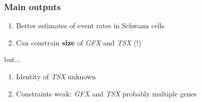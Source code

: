 \documentclass{beamer}
\begin{document}
\begin{frame}
\begin{columns}
\begin{column}{0.5\textwidth}
        \end{column}
    \end{columns}
\end{frame}

%

\begin{frame}
    \frametitle{Main outputs}
    \begin{enumerate}
        \item Better estimates of event rates in Schwann cells
        \item Can constrain \textbf{size} of \emph{GFX} and \emph{TSX} (!)
    \end{enumerate}
    \begin{center}
        but...
    \end{center}
    \begin{enumerate}
        \item Identity of \emph{TSX} unknown
        \item Constraints weak: \emph{GFX} and \emph{TSX} probably multiple genes
    \end{enumerate}

\end{frame}

\end{document}
